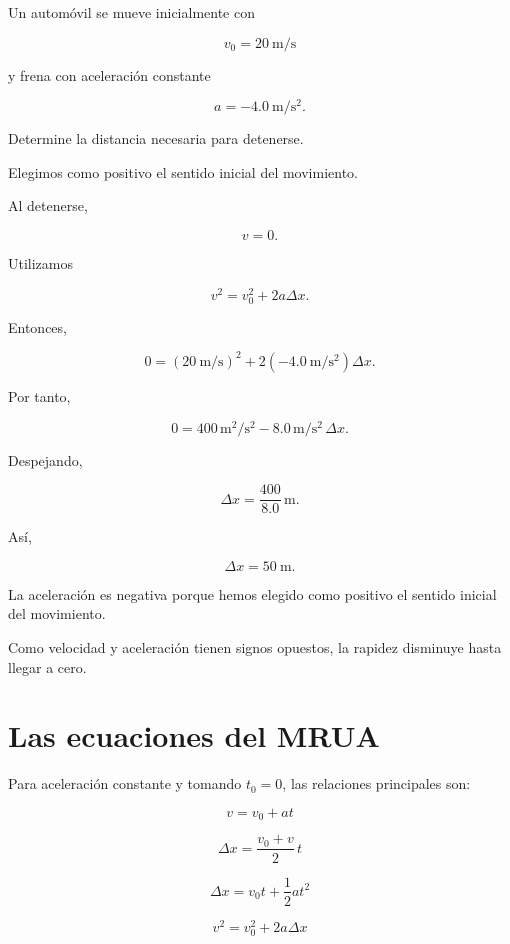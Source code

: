 \begin{ejemplo}

Un automóvil se mueve inicialmente con

\[ v_0=\SI{20}{\meter\per\second} \]

y frena con aceleración constante

\[ a=-\SI{4.0}{\meter\per\second\squared}. \]

Determine la distancia necesaria para detenerse.

Elegimos como positivo el sentido inicial del movimiento.

Al detenerse,

\[ v=0. \]

Utilizamos

\[ v^2=v_0^2+2a\Delta x. \]

Entonces,

\[
0
=
\left(\SI{20}{\meter\per\second}\right)^2
+
2
\left(-\SI{4.0}{\meter\per\second\squared}\right)
\Delta x.
\]

Por tanto,

\[
0
=
400\,\si{\meter\squared\per\second\squared}
-
8.0\,\si{\meter\per\second\squared}\,\Delta x.
\]

Despejando,

\[
\Delta x
=
\frac{400}{8.0}\,\si{\meter}.
\]

Así,

\[ \boxed{\Delta x=\SI{50}{\meter}}. \]

\begin{interpretacion}
La aceleración es negativa porque hemos elegido como positivo el sentido
inicial del movimiento.

Como velocidad y aceleración tienen signos opuestos, la rapidez disminuye
hasta llegar a cero.
\end{interpretacion}
\end{ejemplo}


\section{Las ecuaciones del MRUA}

Para aceleración constante y tomando \(t_0=0\), las relaciones principales
son:

\[
\boxed{v=v_0+at}
\]

\[
\boxed{\Delta x=\frac{v_0+v}{2}\,t}
\]

\[
\boxed{\Delta x=v_0t+\frac{1}{2}at^2}
\]

\[
\boxed{v^2=v_0^2+2a\Delta x}
\]

